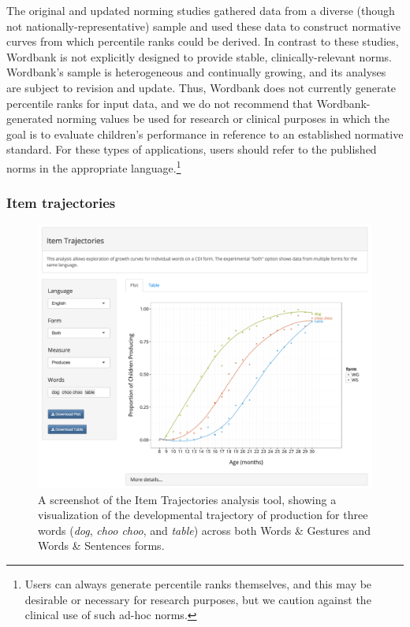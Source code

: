 \documentclass[man,noapacite]{apa}
\begin{document}
The original and updated norming studies \cite{fenson1994,fenson2007} gathered data from a diverse (though not nationally-representative) sample and used these data to construct normative curves from which percentile ranks could be derived. In contrast to these studies, Wordbank is not explicitly designed to provide stable, clinically-relevant norms. Wordbank's sample is heterogeneous and continually growing, and its analyses are subject to revision and update. Thus, Wordbank does not currently generate percentile ranks for input data, and we do not recommend that Wordbank-generated norming values be used for research or clinical purposes in which the goal is to evaluate children's performance in reference to an established normative standard. For these types of applications, users should refer to the published norms in the appropriate language.\footnote{Users can always generate percentile ranks themselves, and this may be desirable or necessary for research purposes, but we caution against the clinical use of such ad-hoc norms.}

\subsubsection{Item trajectories}

\begin{figure}[h!]
\includegraphics[width=6in]{figures/itemsapp.png}
\caption{\label{fig:items} A screenshot of the Item Trajectories analysis tool, showing a visualization of the developmental trajectory of production for three words (\emph{dog}, \emph{choo choo}, and \emph{table}) across both Words \& Gestures and Words \& Sentences forms.}
\end{figure}
\end{document}
